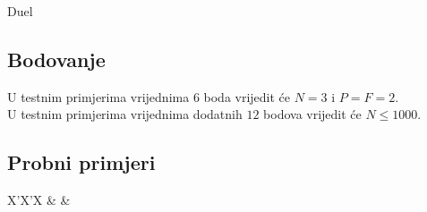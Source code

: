 \begin{statement}[
  problempoints=30,
  timelimit=1 sekunda,
  memorylimit=512 MiB,
]{Duel}
\subsection*{Bodovanje}
U testnim primjerima vrijednima $6$ boda vrijedit će $N = 3$ i $P = F = 2$. \\
U testnim primjerima vrijednima dodatnih $12$ bodova vrijedit će $N \le 1000$.

\subsection*{Probni primjeri}
\begin{tabularx}{\textwidth}{X'X'X}
 &
 &
\end{tabularx}



\end{statement}

